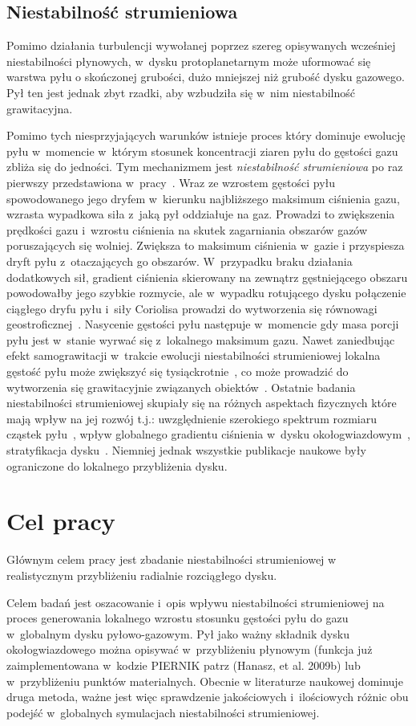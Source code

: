 \subsection{Niestabilność strumieniowa}
Pomimo działania turbulencji wywołanej poprzez szereg opisywanych wcześniej
niestabilności płynowych, w~dysku protoplanetarnym może uformować się warstwa
pyłu o skończonej grubości, dużo mniejszej niż grubość dysku gazowego. Pył ten
jest jednak zbyt rzadki, aby wzbudziła się w~nim niestabilność grawitacyjna.
\par Pomimo tych niesprzyjających warunków istnieje proces który dominuje
ewolucję pyłu w~momencie w~którym stosunek koncentracji ziaren pyłu do gęstości
gazu zbliża się do jedności. Tym mechanizmem jest {\it niestabilność
strumieniowa} po raz pierwszy przedstawiona w~pracy~\cite{YG05}. Wraz ze
wzrostem gęstości pyłu spowodowanego jego dryfem w~kierunku najbliższego
maksimum ciśnienia gazu, wzrasta wypadkowa siła z~jaką pył oddziałuje na gaz.
Prowadzi to zwiększenia prędkości gazu i~wzrostu ciśnienia na skutek zagarniania
obszarów gazów poruszających się wolniej. Zwiększa to maksimum ciśnienia w~gazie
i przyspiesza dryft pyłu z~otaczających go obszarów. W~przypadku braku działania
dodatkowych sił, gradient ciśnienia skierowany na zewnątrz gęstniejącego obszaru
powodowałby jego szybkie rozmycie, ale w~wypadku rotującego dysku połączenie
ciągłego dryfu pyłu i~siły Coriolisa prowadzi do wytworzenia się równowagi
geostroficznej~\cite{JBL11}. Nasycenie gęstości pyłu następuje w~momencie gdy
masa porcji pyłu jest w~stanie wyrwać się z~lokalnego maksimum gazu.  Nawet
zaniedbując efekt samograwitacji w~trakcie ewolucji niestabilności strumieniowej
lokalna gęstość pyłu może zwiększyć się tysiąckrotnie~\cite{JY07}, co może
prowadzić do wytworzenia się grawitacyjnie związanych obiektów~\cite{J07}.
Ostatnie badania niestabilności strumieniowej skupiały się na różnych aspektach
fizycznych które mają wpływ na jej rozwój t.j.: uwzględnienie szerokiego
spektrum rozmiaru cząstek pyłu~\cite{BS10a}, wpływ globalnego gradientu
ciśnienia w~dysku okołogwiazdowym~\cite{BS10b}, stratyfikacja dysku~\cite{T12}.
Niemniej jednak wszystkie publikacje naukowe były ograniczone do lokalnego
przybliżenia dysku.

\section{Cel pracy}
Głównym celem pracy jest zbadanie niestabilności strumieniowej w~
realistycznym przybliżeniu radialnie rozciągłego dysku.

Celem badań jest oszacowanie i~opis wpływu niestabilności strumieniowej na
proces generowania lokalnego wzrostu stosunku gęstości pyłu do gazu w~globalnym
dysku pyłowo-gazowym. Pył jako ważny składnik dysku okołogwiazdowego można
opisywać w~przybliżeniu płynowym (funkcja już zaimplementowana w~kodzie PIERNIK
patrz (Hanasz, et al. 2009b) lub w~przybliżeniu punktów materialnych. Obecnie w
literaturze naukowej dominuje druga  metoda, ważne jest więc sprawdzenie
jakościowych i~ilościowych różnic obu podejść w~globalnych symulacjach
niestabilności strumieniowej. 



